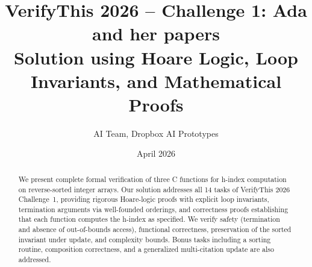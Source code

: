 \documentclass[11pt,a4paper]{article}
\title{\textbf{VerifyThis 2026 -- Challenge 1: Ada and her papers}\\[0.5em]
\large Solution using Hoare Logic, Loop Invariants, and Mathematical Proofs}
\author{AI Team, Dropbox AI Prototypes}
\date{April 2026}
\theoremstyle{definition}
\begin{document}
\maketitle

\begin{abstract}
We present complete formal verification of three C functions for h-index computation
on reverse-sorted integer arrays. Our solution addresses all 14 tasks of
VerifyThis 2026 Challenge~1, providing rigorous Hoare-logic proofs with
explicit loop invariants, termination arguments via well-founded orderings,
and correctness proofs establishing that each function computes the h-index
as specified. We verify safety (termination and absence of out-of-bounds access),
functional correctness, preservation of the sorted invariant under update, and
complexity bounds. Bonus tasks including a sorting routine, composition correctness,
and a generalized multi-citation update are also addressed.
\end{abstract}

\tableofcontents
\newpage








\end{document}
